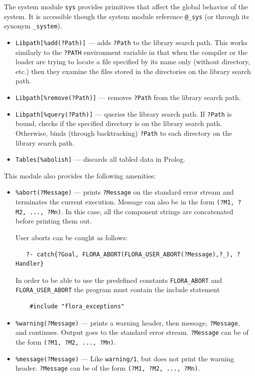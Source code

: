 \documentclass[11pt]{article}
\begin{document}
The system module {\tt sys} provides primitives that affect the global
behavior of the system. It is accessible though the system module reference
{\tt @\_sys} (or through its synonym {\tt \_system}). 
\begin{itemize}
  \item  {\tt Libpath[\%add(?Path)]} --- adds {\tt ?Path} to the library
    search path. This works similarly to the {\tt ?PATH} environment
    variable in that when the compiler or the loader are trying to locate a
    file specified by its name only (without directory, etc.) then they
    examine the files stored in the directories on the library search path.
  \item {\tt Libpath[\%remove(?Path)]} --- removes {\tt ?Path} from the
    library search path.
  \item {\tt Libpath[\%query(?Path)]} --- queries the library search path. If
    {\tt ?Path} is bound, checks if the specified directory is on the
    library search path. Otherwise, binds (through backtracking) {\tt ?Path}
    to each directory on the library search path.
  \item {\tt Tables[\%abolish]} --- discards all tabled data in Prolog.
\end{itemize}
This module also provides the following amenities:
\begin{itemize}
  \item  {\tt \verb|%|abort(?Message)} --- prints {\tt ?Message} on the standard error
  stream and terminates the current execution. Message can also be in the
  form {\tt (?M1, ?M2, ..., ?Mn)}. In this case, all the component strings are
  concatenated before printing them out.

  User aborts can be caught as follows:
  \begin{verbatim}
   ?- catch{?Goal, FLORA_ABORT(FLORA_USER_ABORT(?Message),?_), ?Handler}
  \end{verbatim}
  In order to be able to use the predefined constants {\tt FLORA\_ABORT} and
  {\tt FLORA\_USER\_ABORT} the program must contain the include statement
  \begin{verbatim}
    #include "flora_exceptions"    
  \end{verbatim}
\item {\tt \verb|%|warning(?Message)} --- prints a warning header, then message,
  {\tt ?Message}, and continues. Output goes to the standard error
  stream. {\tt ?Message} can be of the form {\tt (?M1, ?M2, ..., ?Mn)}.
\item {\tt \verb|%|message(?Message)} --- Like {\tt warning/1}, but does not print
  the warning header. {\tt ?Message} can be of the form {\tt (?M1, ?M2, ..., ?Mn)}.
\end{itemize}
\end{document}
